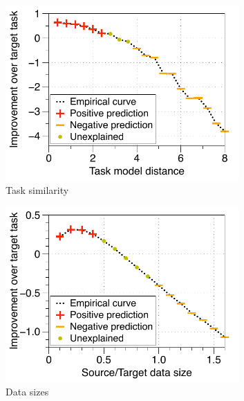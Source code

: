 \begin{figure}[!t]
	\begin{subfigure}[b]{0.32\textwidth}
		\centering
		\includegraphics[width=0.98\textwidth]{figures/model_shift_phase_transition.pdf}
		\vspace{-0.075in}
		\caption{Task similarity}
		\label{fig_model_shift}
	\end{subfigure}\hfill
	\begin{subfigure}[b]{0.32\textwidth}
		\centering
		\includegraphics[width=0.98\textwidth]{figures/datapoints_phase_transition.pdf}
		\vspace{-0.075in}
		\caption{Data sizes}
		\label{fig_size}
	\end{subfigure}\hfill
	\begin{subfigure}[b]{0.32\textwidth}

\end{subfigure}
\end{figure}
